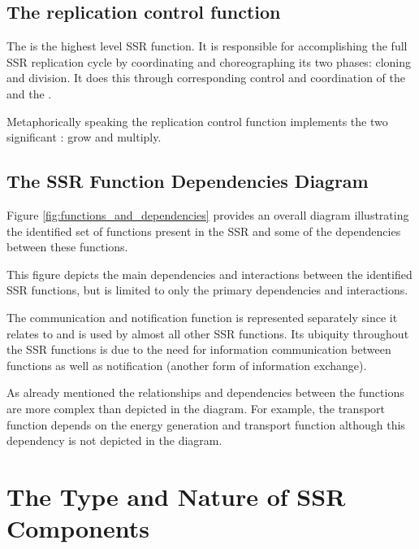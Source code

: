 \subsection[The replication control function]{The replication control
function}

The  is the highest level SSR function. It is responsible 
for
accomplishing the full SSR replication cycle by coordinating and
choreographing its two phases: cloning and division.  It does this through
corresponding control and coordination of the  
and the .

Metaphorically speaking the replication control function implements the
two significant : grow and multiply.

\subsection[The SSR Function Dependencies Diagram]{The SSR Function
Dependencies Diagram}

Figure \ref{fig:functions_and_dependencies}
provides an overall diagram illustrating
the identified set of functions present in the SSR and some of the
dependencies between these functions.

This figure depicts the main dependencies and interactions between the identified SSR
functions, but is limited to only the primary dependencies and interactions.

The communication and notification function is represented separately
since it relates to and is used by almost all other SSR functions.
Its ubiquity throughout the SSR functions is due to the need for information communication between functions as
well as notification (another form of information exchange).

As already mentioned the relationships and dependencies between the
functions are more complex than depicted in the diagram. For
example, the transport function depends on the energy generation and
transport function although this dependency is not depicted in the
diagram.


\section{The Type and Nature of SSR Components}

